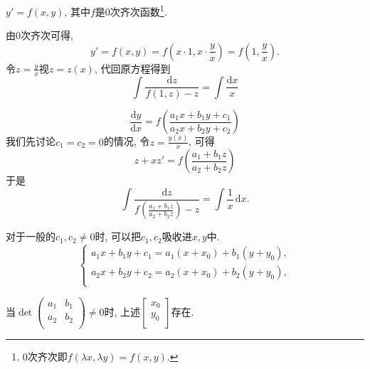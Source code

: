 \begin{example}
  $y' = f(x,y)$, 其中$f$是$0$次齐次函数\footnote{$0$次齐次即$f(\lambda x, \lambda y) = f(x,y)$.}.

  由$0$次齐次可得,
  \begin{equation}
    y' = f(x,y) = f(x \cdot 1, x \cdot \frac{y}{x}) = f(1, \frac{y}{x}).
  \end{equation}
  令$z = \frac{y}{x}$视$z = z(x)$, 代回原方程得到
  \begin{equation}
    \int \frac{\mathrm{d} z}{f(1,z) - z} = \int \frac{\mathrm{d} x}{x}
  \end{equation}
\end{example}

\begin{example}
  \begin{equation}
    \frac{\mathrm{d} y}{\mathrm{d} x} = f \left( \frac{a_1x + b_1y + c_1}{a_2 x + b_2y + c_2} \right)
  \end{equation}
  我们先讨论$c_1=c_2=0$的情况, 令$z=\frac{y(x)}{x}$, 可得
  \begin{equation}
    z + xz' = f(\frac{a_1 + b_1 z}{a_2 + b_2z})
  \end{equation}
  于是
  \begin{equation}
    \int \frac{\mathrm{d} z}{f\left( \frac{a_1+b_1z}{a_2+b_2z} \right) - z} = \int \frac{1}{x} \, \mathrm{d} x.
  \end{equation}

  对于一般的$c_1, c_2 \neq 0$时, 可以把$c_1, c_2$吸收进$x,y$中.
  \begin{equation}
    \begin{cases}
      a_1x + b_1y + c_1 = a_1 \left( x+x_0 \right) + b_1 \left( y+y_0 \right), \\
      a_2x + b_2y + c_2 = a_2 \left( x+x_0 \right) + b_2 \left( y+y_0 \right), \\
    \end{cases}
  \end{equation}

  当$\det \begin{pmatrix}
  a_1 & b_1\\
  a_2 & b_2\\
  \end{pmatrix}\neq 0$时, 上述$\begin{bmatrix}
  x_0\\
  y_0\\
  \end{bmatrix}$存在.


\end{example}
